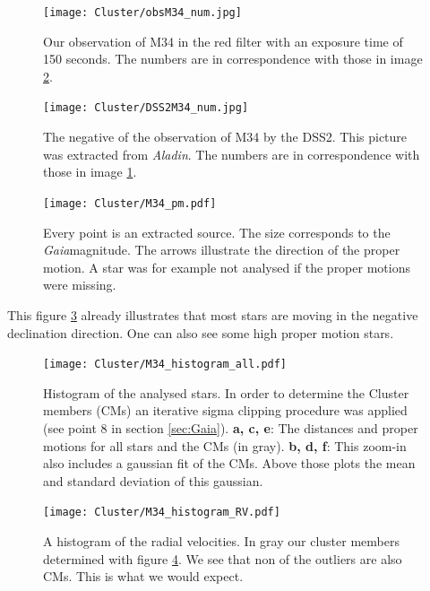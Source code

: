 \documentclass{article}
\begin{document}
\begin{figure}[H]
  \centering
    \texttt{[image: Cluster/obsM34\_num.jpg]}
  \caption{Our observation of M34 in the red filter with an exposure time of 150 seconds. The numbers are in correspondence with those in image \ref{fig:DSS2M34_num}.}
  \label{fig:obsM34_num}
\end{figure}

\begin{figure}[H]
  \centering
    \texttt{[image: Cluster/DSS2M34\_num.jpg]}
  \caption{The negative of the observation of M34 by the DSS2. This picture was extracted from \textit{Aladin}. The numbers are in correspondence with those in image \ref{fig:obsM34_num}.}
  \label{fig:DSS2M34_num}
\end{figure}

\begin{figure}[H]
  \centering
    \texttt{[image: Cluster/M34\_pm.pdf]}
  \caption{Every point is an extracted source. The size corresponds to the \textit{Gaia}magnitude. The arrows illustrate the direction of the proper motion. A star was for example not analysed if the proper motions were missing.}
  \label{fig:M34_pm}
\end{figure}

This figure \ref{fig:M34_pm} already illustrates that most stars are moving in the negative declination direction. One can also see some high proper motion stars.

\begin{figure}[H]
  \centering
    \texttt{[image: Cluster/M34\_histogram\_all.pdf]}
  \caption{Histogram of the analysed stars. In order to determine the Cluster members (CMs) an iterative sigma clipping procedure was applied (see point 8 in section \ref{sec:Gaia}). \textbf{a, c, e}: The distances and proper motions for all stars and the CMs (in gray). \textbf{b, d, f}: This zoom-in also includes a gaussian fit of the CMs. Above those plots the mean and standard deviation of this gaussian.}
  \label{fig:M34_histogram_all}
\end{figure}

\begin{figure}[H]
  \centering
    \texttt{[image: Cluster/M34\_histogram\_RV.pdf]}
  \caption{A histogram of the radial velocities. In gray our cluster members determined with figure \ref{fig:M34_histogram_all}. We see that non of the outliers are also CMs. This is what we would expect.}
  \label{fig:M34_histogram_RV}
\end{figure}
\end{document}
